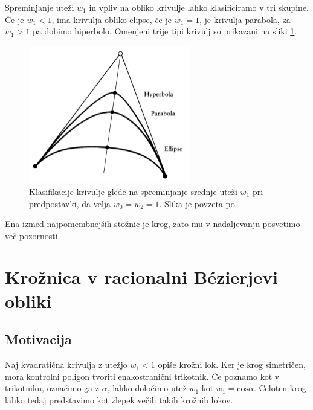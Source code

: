 \documentclass[a4paper,11pt]{article}
\theoremstyle{definition}
\theoremstyle{plain}
\begin{document}
\newpage
Spreminjanje uteži $w_1$ in vpliv na obliko krivulje lahko klasificiramo v tri skupine. Če je $w_1 < 1$, ima krivulja obliko elipse, če je $w_1 = 1$, je krivulja parabola, za $w_1 > 1$ pa dobimo hiperbolo. Omenjeni trije tipi krivulj so prikazani na sliki \ref{slika:klasifikacija}.

\begin{figure}[ht!]
    \centering
    \includegraphics[width=70mm]{tri_oblike.png}
    \caption{Klasifikacije krivulje glede na spreminjanje srednje uteži $w_1$ pri predpostavki, da velja $w_0 = w_2 = 1$. Slika je povzeta po \cite{farin}.}
    \label{slika:klasifikacija}
\end{figure}
\noindent
Ena izmed najpomembnejših stožnic je krog, zato mu v nadaljevanju posvetimo več pozornosti.



\section{Krožnica v racionalni B\'ezierjevi obliki}

\subsection{Motivacija}

Naj kvadratična krivulja z utežjo $w_1 < 1$ opiše krožni lok. Ker je krog simetričen, mora kontrolni poligon tvoriti enakostranični trikotnik.
Če poznamo kot v trikotniku, označimo ga z $\alpha$, lahko določimo utež $w_1$ kot $w_1 = \text{cos} \alpha$.
Celoten krog lahko tedaj predstavimo kot zlepek večih takih krožnih lokov. 
\end{document}

